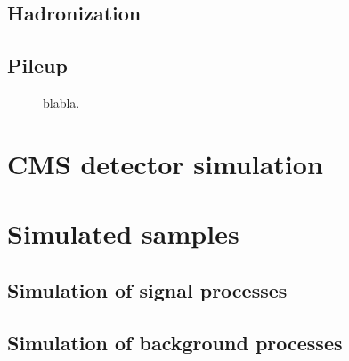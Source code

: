 \subsection{Hadronization}

\subsection{Pileup}


\begin{figure}[!htb]
\centering
{}
\caption{blabla.}
\label{fig:pu_mc_data}
\end{figure}

\section{CMS detector simulation}

\section{Simulated samples}

\subsection{Simulation of signal processes}\label{subsec:signalMC}
\subsection{Simulation of background processes}
